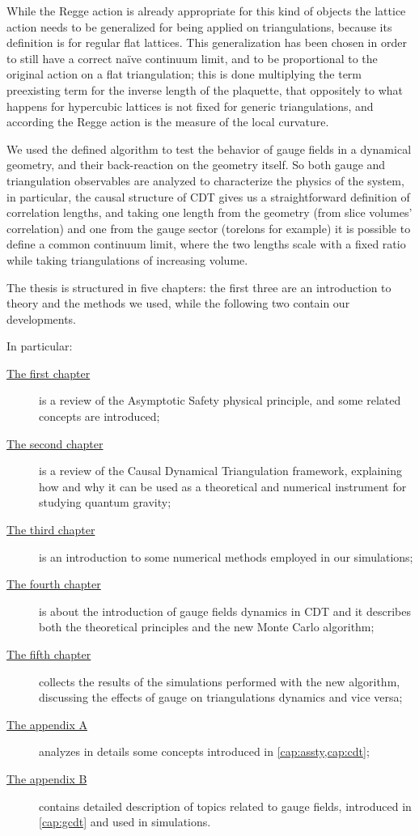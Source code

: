 While the Regge action is already appropriate for this kind of objects the lattice action needs to be generalized for being applied on triangulations, because its definition is for regular flat lattices.
This generalization has been chosen in order to still have a correct naïve continuum limit, and to be proportional to the original action on a flat triangulation; this is done multiplying the term preexisting term for the inverse length of the plaquette, that oppositely to what happens for hypercubic lattices is not fixed for generic triangulations, and according the Regge action is the measure of the local curvature.
\newline

\indent We used the defined algorithm to test the behavior of gauge fields in a dynamical geometry, and their back-reaction on the geometry itself.
So both gauge and triangulation observables are analyzed to characterize the physics of the system, in particular, the causal structure of CDT gives us a straightforward definition of correlation lengths, and taking one length from the geometry (from slice volumes' correlation) and one from the gauge sector (torelons for example) it is possible to define a common continuum limit, where the two lengths scale with a fixed ratio while taking triangulations of increasing volume.



\vspace*{20pt}

The thesis is structured in five chapters: the first three are an introduction to theory and the methods we used, while the following two contain our developments.

In particular:
\begin{description}
\item[{\hyperref[cap:assty]{The first chapter}}] is a review of the Asymptotic Safety physical principle, and some related concepts are introduced;
\item[{\hyperref[cap:cdt]{The second chapter}}] is a review of the Causal Dynamical Triangulation framework, explaining how and why it can be used as a theoretical and numerical instrument for studying quantum gravity;
\item[{\hyperref[cap:nummet]{The third chapter}}] is an introduction to some numerical methods employed in our simulations;
\item[{\hyperref[cap:gcdt]{The fourth chapter}}] is about the introduction of gauge fields dynamics in CDT and it describes both the theoretical principles and the new Monte Carlo algorithm;
\item[{\hyperref[cap:res]{The fifth chapter}}] collects the results of the simulations performed with the new algorithm, discussing the effects of gauge on triangulations dynamics and vice versa;
\item[{\hyperref[cap:misc]{The appendix A}}] analyzes in details some concepts introduced in \cref{cap:assty,cap:cdt};
\item[{\hyperref[cap:gaugeapp]{The appendix B}}] contains detailed description of topics related to gauge fields, introduced in \cref{cap:gcdt} and used in simulations.
\end{description}